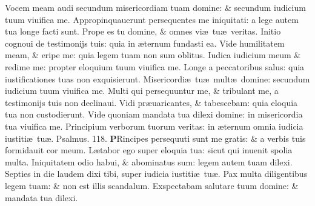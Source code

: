 \documentclass[a5paper,10pt]{book}
\def\ae{æ}
\begin{document}
\begin{multicols*}{2}
\newline \color{red} V\color{black}ocem meam audi secundum misericordiam tuam domine: \& secundum iudicium tuum viuifica me.
\newline \color{red} A\color{black}ppropinquauerunt persequentes me iniquitati: a lege autem tua longe facti sunt.
\newline \color{red} P\color{black}rope es tu domine, \& omnes vi\ae \ tu\ae \ veritas.
\newline \color{red} I\color{black}nitio cognoui de testimonijs tuis: quia in \ae ternum fundasti ea.
\newline \color{red} V\color{black}ide humilitatem meam, \& eripe me: quia legem tuam non sum oblitus.
\newline \color{red} I\color{black}udica iudicium meum \& redime me: propter eloquium tuum viuifica me.
\newline \color{red} L\color{black}onge a peccatoribus salus: quia iustificationes tuas non exquisierunt.
\newline \color{red} M\color{black}isericordi\ae \ tu\ae \ mult\ae \ domine: secundum iudicium tuum viuifica me.
\newline \color{red} M\color{black}ulti qui persequuntur me, \& tribulant me, a testimonijs tuis non declinaui.
\newline \color{red} V\color{black}idi pr\ae uaricantes, \& tabescebam: quia eloquia tua non custodierunt.
\newline \color{red} V\color{black}ide quoniam mandata tua dilexi domine: in misericordia tua viuifica me.
\newline \color{red} P\color{black}rincipium verborum tuorum veritas: in \ae ternum omnia iudicia iustiti\ae \ tu\ae . \quad \color{red} Psalmus. 118. \color{black}
\vspace{-.5em}
\lettrine[lines=2]{\bfseries \color{red} P}{}Rincipes persequuti sunt me gratis: \& a verbis tuis formidauit cor meum.%
\newline \color{red} L\color{black}\ae tabor ego super eloquia tua: sicut qui inuenit spolia multa.
\newline \color{red} I\color{black}niquitatem odio habui, \& abominatus sum: legem autem tuam dilexi.
\newline \color{red} S\color{black}epties in die laudem dixi tibi, super iudicia iustiti\ae \ tu\ae .
\newline \color{red} P\color{black}ax multa diligentibus legem tuam: \& non est illis scandalum.
\newline \color{red} E\color{black}xspectabam salutare tuum domine: \& mandata tua dilexi.

\end{multicols*}
\end{document}
